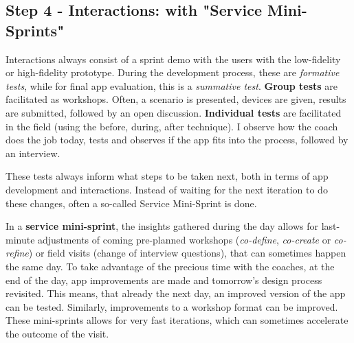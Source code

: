   \subsection{Step 4 - Interactions: with "Service Mini-Sprints"}
  Interactions always consist of a sprint demo with the users with the low-fidelity or high-fidelity prototype. During the development process, these are \textit{formative tests}, while for final app evaluation, this is a \textit{summative test}. \textbf{Group tests} are facilitated as workshops. Often, a scenario is presented, devices are given, results are submitted, followed by an open discussion. \textbf{Individual tests} are facilitated in the field (using the before, during, after technique). I observe how the coach does the job today, tests and observes if the app fits into the process, followed by an interview.

    These tests always inform what steps to be taken next, both in terms of app development and interactions. Instead of waiting for the next iteration to do these changes, often a so-called Service Mini-Sprint is done.

    In a \textbf{service mini-sprint}\label{mini-sprint}, the insights gathered during the day allows for last-minute adjustments of coming pre-planned workshops (\textit{co-define}, \textit{co-create} or \textit{co-refine}) or field visits (change of interview questions), that can sometimes happen the same day. To take advantage of the precious time with the coaches, at the end of the day, app improvements are made and tomorrow's design process revisited. This means, that already the next day, an improved version of the app can be tested. Similarly, improvements to a workshop format can be improved. These mini-sprints allows for very fast iterations, which can sometimes accelerate the outcome of the visit.
